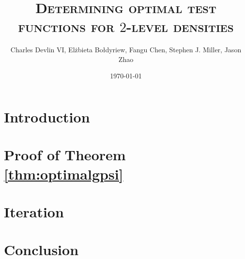\documentclass[12pt, reqno]{amsart}
\title
{
	\textsc{Determining optimal test functions for $2$-level densities}
}
\author{Charles Devlin VI, El\.zbieta Bo\l dyriew, Fangu Chen, Stephen J. Miller, Jason Zhao}
\date{\today}
\numberwithin{equation}{section}
\theoremstyle{definition}
\theoremstyle{remark}
\begin{document}
\begin{titlepage}
\maketitle

\begin{abstract}
	
\end{abstract}

\tableofcontents
\end{titlepage}
\section{Introduction}


\section{Proof of Theorem \ref{thm:optimalgpsi}}


\section{Iteration}


\section{Conclusion}



 
\end{document}
